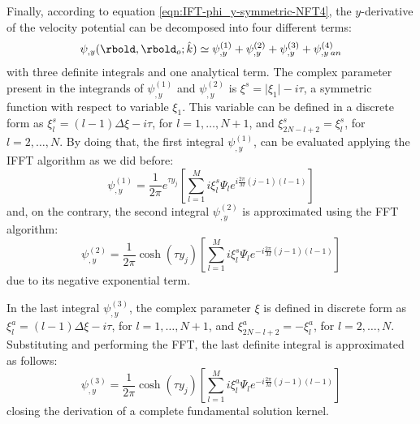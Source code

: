 Finally, according to equation \eqref{eqn:IFT-phi_y-symmetric-NFT4}, the $y$-derivative of the velocity potential can be decomposed into four different terms:
%
\begin{equation}
\psi_{,y}(\rbold,\rbold_{o}; \hat{k}) \simeq \psi^{(1)}_{,y} + \psi^{(2)}_{,y} + \psi^{(3)}_{,y} + \psi^{(4)}_{,y \: an}
\end{equation}
%
with three definite integrals and one analytical term. The complex parameter present in the integrands of $\psi^{(1)}_{,y}$ and $\psi^{(2)}_{,y}$ is $\xi^{s} = \vert \xi_{1} \vert -i\tau$, a symmetric function with respect to variable $\xi_{1}$. This variable can be defined in a discrete form as $\xi^{s}_{l}= (l-1) \Delta \xi -i \tau$, for 
$l=1,\ldots,N+1$, and $\xi^{s}_{2N-l+2}=\xi^{s}_{l}$, for  $l=2,\ldots,N$. By doing that, the first integral $\psi^{(1)}_{,y}$, can be evaluated applying the IFFT algorithm as we did before:
%
\begin{equation}
\psi_{,y}^{(1)}=\dfrac{1}{2\pi} e^{\tau y_{j}} \left[ \sum_{l=1}^{M} i\xi^{s}_{l} \varPsi_{l} e^{i\frac{2\pi}{M}(j-1)(l-1)}
\right]
\end{equation}
%
and, on the contrary, the second integral $\psi^{(2)}_{,y}$ is approximated using the FFT algorithm:
%
\begin{equation}
\psi_{,y}^{(2)}=\dfrac{1}{2\pi} \cosh{(\tau y_{j})} \left[ \sum_{l=1}^{M} i\xi^{s}_{l} \varPsi_{l} e^{-i\frac{2\pi}{M}(j-1)(l-1)}
\right]
\end{equation}
%
due to its negative exponential term.

In the last integral $\psi^{(3)}_{,y}$, the complex parameter $\xi$ is defined in discrete form as
%
$\xi^{a}_{l}= (l-1) \Delta \xi -i \tau$, for 
$l=1,\ldots,N+1$,
and 
$\xi^{a}_{2N-l+2}=-\xi^{a}_{l}$, for  $l=2,\ldots,N$.
%
%
Substituting and performing the FFT, the last definite integral is approximated as follows:
%
\begin{equation}
\psi_{,y}^{(3)}=\dfrac{1}{2\pi} \cosh{(\tau y_{j})} \left[ \sum_{l=1}^{M} i\xi_{l}^{a} \varPsi_{l} e^{-i\frac{2\pi}{M}(j-1)(l-1)}
\right]
\end{equation}
closing the derivation of a complete fundamental solution kernel.

